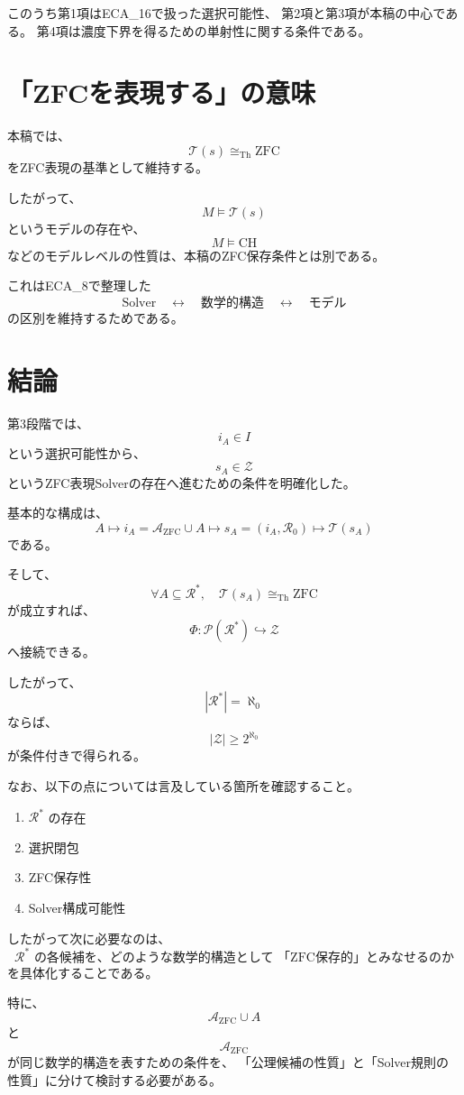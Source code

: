 \documentclass[11pt,a4paper]{article}
\begin{document}
このうち第1項はECA\_16で扱った選択可能性、
第2項と第3項が本稿の中心である。
第4項は濃度下界を得るための単射性に関する条件である。

\section{「ZFCを表現する」の意味}

本稿では、
\[
\mathcal{T}(s)\cong_{\mathrm{Th}}\mathrm{ZFC}
\]
をZFC表現の基準として維持する。

したがって、
\[
M\models\mathcal{T}(s)
\]
というモデルの存在や、
\[
M\models\mathrm{CH}
\]
などのモデルレベルの性質は、本稿のZFC保存条件とは別である。

これはECA\_8で整理した
\[
\text{Solver}
\quad\longleftrightarrow\quad
\text{数学的構造}
\quad\longleftrightarrow\quad
\text{モデル}
\]
の区別を維持するためである。

\section{結論}

第3段階では、
\[
i_A\in I
\]
という選択可能性から、
\[
s_A\in\mathcal{Z}
\]
というZFC表現Solverの存在へ進むための条件を明確化した。

基本的な構成は、
\[
A
\longmapsto
i_A
=
\mathcal{A}_{\mathrm{ZFC}}\cup A
\longmapsto
s_A
=
(i_A,\mathcal{R}_0)
\longmapsto
\mathcal{T}(s_A)
\]
である。

そして、
\[
\forall A\subseteq\mathcal{R}^*,
\quad
\mathcal{T}(s_A)\cong_{\mathrm{Th}}\mathrm{ZFC}
\]
が成立すれば、
\[
\Phi:\mathcal{P}(\mathcal{R}^*)\hookrightarrow\mathcal{Z}
\]
へ接続できる。

したがって、
\[
|\mathcal{R}^*|=\aleph_0
\]
ならば、
\[
|\mathcal{Z}|\geq2^{\aleph_0}
\]
が条件付きで得られる。

なお、以下の点については言及している箇所を確認すること。

\begin{enumerate}
  \item $\mathcal{R}^*$ の存在
  \item 選択閉包
  \item ZFC保存性
  \item Solver構成可能性
\end{enumerate}



したがって次に必要なのは、
\[
\boxed{
\mathcal{R}^*
\text{ の各候補を、どのような数学的構造として
「ZFC保存的」とみなせるのか}
}
\]
を具体化することである。

特に、
\[
\mathcal{A}_{\mathrm{ZFC}}\cup A
\]
と
\[
\mathcal{A}_{\mathrm{ZFC}}
\]
が同じ数学的構造を表すための条件を、
「公理候補の性質」と「Solver規則の性質」に分けて検討する必要がある。
\end{document}

